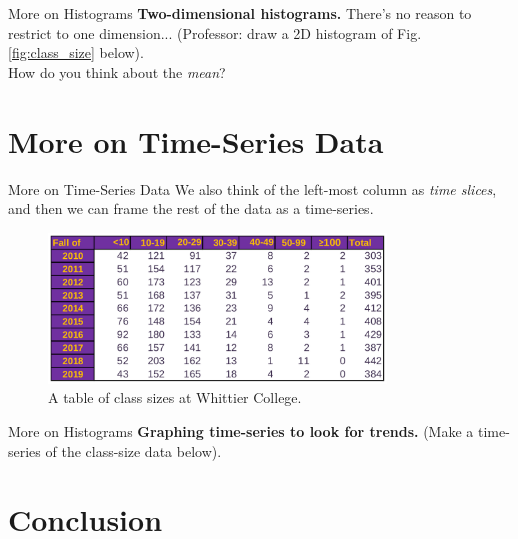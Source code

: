 \documentclass{beamer}
\begin{document}
\begin{frame}{More on Histograms}
\textbf{Two-dimensional histograms.}  There's no reason to restrict to one dimension... (Professor: draw a 2D histogram of Fig. \ref{fig:class_size} below). \\ \vspace{6cm}
How do you think about the \textit{mean}?
\end{frame}

\section{More on Time-Series Data}

\begin{frame}{More on Time-Series Data}
We also think of the left-most column as \textit{time slices}, and then we can frame the rest of the data as a time-series.
\begin{figure}
\centering
\includegraphics[width=0.8\textwidth]{figures/class_size.png}
\caption{\label{fig:class_size2} A table of class sizes at Whittier College.}
\end{figure}
\end{frame}

\begin{frame}{More on Histograms}
\textbf{Graphing time-series to look for trends.} (Make a time-series of the class-size data below). \\ \vspace{6cm}
\end{frame}

\section{Conclusion}
\end{document}
